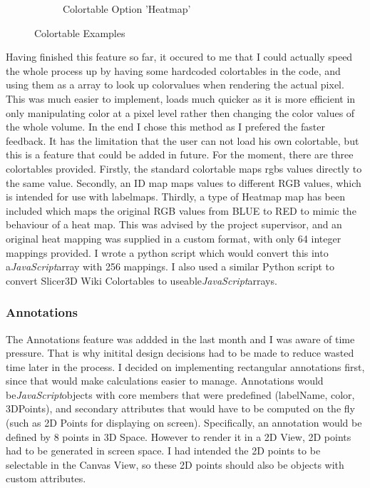 \documentclass[a4paper,11pt,twoside]{article}
\begin{document}
\begin{figure}
\begin{subfigure}{.33\textwidth}
  \caption{Colortable Option 'Heatmap'}
\end{subfigure}
\caption{Colortable Examples}

\end{figure}


Having finished this feature so far, it occured to me that I could actually speed the whole process up by having some hardcoded colortables in the code, and using them as a array to look up colorvalues when rendering the actual pixel. This was much easier to implement, loads much quicker as it is more efficient in only manipulating color at a pixel level rather then changing the color values of the whole volume. In the end I chose this method as I prefered the faster feedback. It has the limitation that the user can not load his own colortable, but this is a feature that could be added in future. For the moment, there are three colortables provided. Firstly, the standard colortable maps rgbs values directly to the same value. Secondly, an ID map maps values to different RGB values, which is intended for use with labelmaps. Thirdly, a type of Heatmap map has been included which maps the original RGB values from BLUE to RED to mimic the behaviour of a heat map. This was advised by the project supervisor, and an original heat mapping was supplied in a custom format, with only 64 integer mappings provided. I wrote a python script which would convert this into a\textit{JavaScript}array with 256 mappings. I also used a similar Python script to convert Slicer3D Wiki Colortables to useable\textit{JavaScript}arrays.



\subsubsection{Annotations}



The Annotations feature was addded in the last month and I was aware of time pressure. That is why initital design decisions had to be made to reduce wasted time later in the process. I decided on implementing rectangular annotations first, since that would make calculations easier to manage. Annotations would be\textit{JavaScript}objects with core members that were predefined (labelName, color, 3DPoints), and secondary attributes that would have to be computed on the fly (such as 2D Points for displaying on screen). Specifically, an annotation would be defined by 8 points in 3D Space. However to render it in a 2D View, 2D points had to be generated in screen space. I had intended the 2D points to be selectable in the Canvas View, so these 2D points should also be objects with custom attributes.
\end{document}
